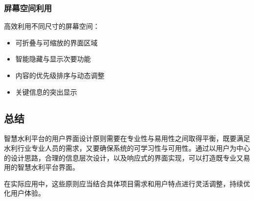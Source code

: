 \subsubsection{屏幕空间利用}\label{ux5c4fux5e55ux7a7aux95f4ux5229ux7528}

高效利用不同尺寸的屏幕空间：

\begin{itemize}
\tightlist
\item
  可折叠与可缩放的界面区域
\item
  智能隐藏与显示次要功能
\item
  内容的优先级排序与动态调整
\item
  关键信息的突出显示
\end{itemize}

\subsection{总结}\label{ux603bux7ed3}

智慧水利平台的用户界面设计原则需要在专业性与易用性之间取得平衡，既要满足水利行业专业人员的需求，又要确保系统的可学习性与可用性。通过以用户为中心的设计思路，合理的信息层次设计，以及响应式的界面实现，可以打造既专业又易用的智慧水利平台界面。

在实际应用中，这些原则应当结合具体项目需求和用户特点进行灵活调整，持续优化用户体验。
